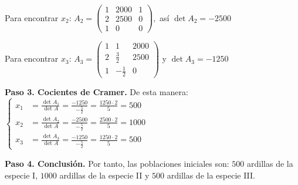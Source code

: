 \begin{prob}
\begin{myproof}
Para encontrar $x_2$: \(
A_2 = \begin{pmatrix}
1 & 2000 & 1\\
2 & 2500 & 0\\
1 & 0 & 0
\end{pmatrix}
,\) así \( \det A_2 = -2500 \)

Para encontrar $x_3$: \(
A_3 = \begin{pmatrix}
1 & 1 & 2000\\
2 & \frac{3}{2} & 2500\\
1 & -\frac{1}{2} & 0
\end{pmatrix}
\) y \(
\det A_3 = -1250 \)

\textbf{Paso 3. Cocientes de Cramer.} De esta manera: $\begin{cases}
x_1 &= \frac{\det A_1}{\det A} = \frac{-1250}{-\frac{5}{2}} = \frac{1250 \cdot 2}{5} = 500\\
x_2 &= \frac{\det A_2}{\det A} = \frac{-2500}{-\frac{5}{2}} = \frac{2500 \cdot 2}{5} = 1000\\
x_3 &= \frac{\det A_3}{\det A} = \frac{-1250}{-\frac{5}{2}} = \frac{1250 \cdot 2}{5} = 500
\end{cases}$

\textbf{Paso 4. Conclusión.} Por tanto, las poblaciones iniciales son: $\boxed{500}$ ardillas de la especie I, $\boxed{1000}$ ardillas de la especie II y $\boxed{500}$ ardillas de la especie III.
\end{myproof}
\end{prob}


